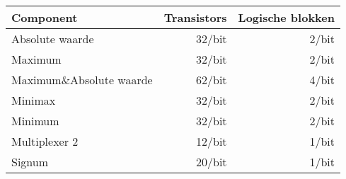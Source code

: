 \begin{tabular}{l|rr}
Component&Transistors&Logische blokken\\\hline
Absolute waarde&32/bit&2/bit\\
Maximum&32/bit&2/bit\\
Maximum\&Absolute waarde&62/bit&4/bit\\
Minimax&32/bit&2/bit\\
Minimum&32/bit&2/bit\\
Multiplexer 2&12/bit&1/bit\\
Signum&20/bit&1/bit
\end{tabular}